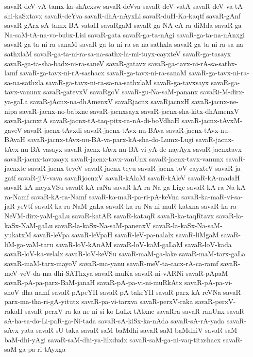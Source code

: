 {savaR-deV-vA-tamx-ka-shAcxsw
savaR-deVva
savaR-deV-vatA
savaR-deV-va-tA-shi-kaSxtavx
savaR-deYva
savaR-dhA-nAyxLi
savaR-duH-Ka-kaqtf
savaR-gAnf
savaR-gArx-sA-tamx-BA-vataH
savaRgaM
savaR-ga-NA-cA-ra-diMda
savaR-ga-Na-saM-tA-na-vo-bubx-Lisi
savaR-gata
savaR-ga-ta-nAgi
savaR-ga-ta-na-nAnxgi
savaR-ga-ta-ni-ra-sanaM
savaR-ga-ta-ni-ra-sa-na-sathxla
savaR-ga-ta-ni-ra-sa-na-sathxlaM
savaR-ga-ta-ni-ra-sa-na-sathx-la-mi-tuyx-cayxteV
savaR-ga-tasayx
savaR-ga-ta-sha-badx-ni-ra-saneV
savaR-gatavx
savaR-ga-tavx-ni-rA-sa-sathx-lamf
savaR-ga-tavx-ni-rA-sashacx
savaR-ga-tavx-ni-ra-sanaM
savaR-ga-tavx-ni-ra-sa-na-sathxla
savaR-ga-tavx-ni-ra-sa-na-sathxlaM
savaR-ga-tavxsayx
savaR-ga-tavx-vanunx
savaR-gatevxV
savaRgoV
savaR-gu-Na-saM-pananx
savaRi-M-dirx-ya-gaLa
savaR-jAcnx-na-dhAmenxV
savaRjacnx
savaRjacnxH
savaR-jacnx-ne-nipa
savaR-jacnx-no-babxne
savaR-jacnxsayx
savaR-jacnx-sha-kitx-dhAmenxV
savaR-jacnxtA
savaR-jacnx-tA-taq-pitx-ra-nA-di-boVdhaH
savaR-jacnx-tAvxM-gaveV
savaR-jacnx-tAvxdi
savaR-jacnx-tAvx-nu-BAva
savaR-jacnx-tAvx-nu-BAvaH
savaR-jacnx-tAvx-nu-BA-va-parx-kA-sha-do-Lumx-Lugi
savaR-jacnx-tAvx-nu-BA-vasayx
savaR-jacnx-tAvx-nu-BA-vi-yA-de-nayAyx
savaR-jacnxtavx
savaR-jacnx-tavxsayx
savaR-jacnx-tavx-vanUnx
savaR-jacnx-tavx-vanunx
savaR-jacnxte
savaR-jacnx-teyeV
savaR-jacnx-teyu
savaR-jacnx-toV-cayxteV
savaR-ja-gatf
savaR-jiV-vava
savaRjocnxV
savaR-kAlaM
savaR-kAleV
savaR-kA-madaH
savaR-kA-meyxVSu
savaR-kA-raNa
savaR-kA-ra-Na-ga-Lige
savaR-kA-ra-Na-kA-ra-Namf
savaR-kA-ra-Namf
savaR-ka-maR-pa-ri-pA-keVna
savaR-ka-maR-vi-sa-jaR-yeVtf
savaR-ka-ra-NaM-gaLa
savaR-ka-ra-Na-ni-muR-katxna
savaR-ka-ra-NeVM-dirx-yaM-gaLu
savaR-katAR
savaR-kataqR
savaR-ka-taqRtavx
savaR-la-kaSx-NaM-gaLu
savaR-la-kaSx-Na-saM-panenxV
savaR-la-kaSx-Na-saM-yukatxM
savaR-leVpa
savaR-leVpaH
savaR-leV-pa-nalalx
savaR-liMgaM
savaR-liM-ga-vaM-taru
savaR-loV-kAnAM
savaR-loV-kaM-gaLaM
savaR-loV-kada
savaR-loV-ka-velalx
savaR-loV-keVSu
savaR-maM-ga-lake
savaR-maM-tarx-gaLa
savaR-maM-tarx-mayoV
savaR-ma-yanu
savaR-meV-ta-cacx-rA-ca-ramf
savaR-meV-veV-da-ma-dhi-SAThxya
savaR-muKa
savaR-ni-vARNi
savaR-pApaM
savaR-pA-pa-parx-BaM-janaH
savaR-pA-pa-vi-ni-muRkAtx
savaR-pA-pa-vi-shoV-dha-namf
savaR-pApeYH
savaR-pA-takeYH
savaR-parx-kA-reVNa
savaR-parx-ma-tha-ri-gA-yitutx
savaR-pa-vi-tarxva
savaR-perxV-raka
savaR-perxV-rakaH
savaR-perxV-ra-ka-ne-ni-si-ko-LuLx-tAtxne
savaRra
savaR-ranUnx
savaR-sA-ha-sa-do-Li-paR-ga-Ni-tada
savaR-sA-kiSx-ka-nAda
savaR-sA-rA-yada
savaR-sAvx-yata
savaR-sU-taka
savaR-saM-baMdhi
savaR-saM-baMdhiV
savaR-saM-baM-dhi-yAgi
savaR-saM-dhi-ya-lilxdudx
savaR-saM-ga-ni-vaq-titxshacx
savaR-saM-ga-pa-ri-tAyxga
}
